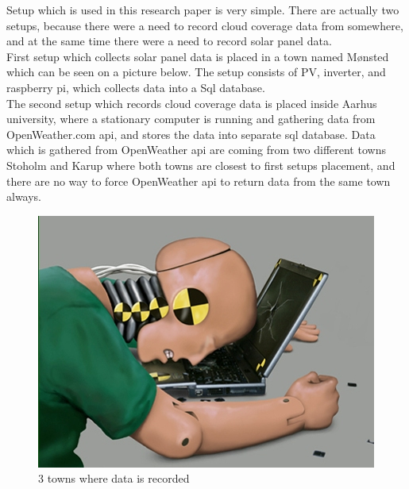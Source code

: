 Setup which is used in this research paper is very simple. There are actually two setups, because there were a need to record cloud coverage data from somewhere, and at the same time there were a need to record solar panel data.\\ 
First setup which collects solar panel data is placed in a town named Mønsted which can be seen on a picture below. The setup consists of  PV, inverter, and raspberry pi, which collects data into a Sql database. \\
The second setup which records cloud coverage data is placed inside Aarhus university, where a stationary computer is running and gathering data from OpenWeather.com api, and stores the data into separate sql database. Data which is gathered from OpenWeather api are coming from two different towns Stoholm and Karup where both towns are closest to first setups placement, and there are no way to force OpenWeather api to return data from the same town always.


\begin{figure}[h]
  \centering
 \includegraphics{dummy.jpg}
  \caption{3 towns where data is recorded}
      \label{fig:MapsPicture}
\end{figure}